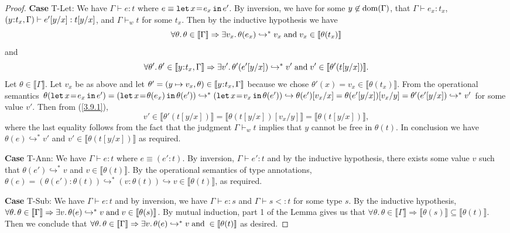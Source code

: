 \documentclass[11pt]{article}
\newcommand{\bind}{\hspace{0.05em}{:}\hspace{0.05em}} %
\newcommand{\col}{\mathbin{:}}       %
\newcommand{\lb}{\llbracket}         %
\newcommand{\rb}{\rrbracket}         %
\newcommand{\step}{\hookrightarrow}
\newcommand{\many}{\hookrightarrow^*}
\newcommand{\foralltheta}{\forall\theta.\,\theta\in\lb\Gamma\rb}
\newcommand{\letin}[3]{{\tt let}\,#1\hspace{0.1em}{=}\hspace{0.1em}#2\,{\tt in}\,#3}
\newcommand{\dom}[1]{{\rm dom}(#1)}
\begin{document}
\begin{proof}
{\bf Case} {\sc T-Let}: We have $\Gamma \vdash e : t$ where
$e \equiv \letin{x}{e_x}{e'}$.
By inversion, we have for some $y\not\in\dom{\Gamma}$, that
$\Gamma \vdash e_x : t_x$,\; $(y\bind t_x,\Gamma) \vdash e'[y/x] : t[y/x]$, and $\Gamma \vdash_w t$
for some $t_x$. Then by the inductive hypothesis we have
\[
\foralltheta \Rightarrow \exists v_x.\, \theta(e_x) \many v_x \;{\rm and}\; v_x \in \lb\theta(t_x)\rb
\] and 
\begin{equation}\label{3.9.1}
\forall\theta'.\, \theta' \in \lb y\bind t_x, \Gamma\rb \Rightarrow \exists v'.\, \theta'(e'[y/x]) \many v' \;{\rm and}\; v' \in \lb\theta'(t[y/x])\rb.
\end{equation}
Let $\theta \in \lb\Gamma\rb$. Let $v_x$ be as above and let $\theta' = (y\mapsto v_x, \theta)\in \lb y\bind t_x,\Gamma\rb$ because we chose $\theta'(x) = v_x \in \lb\theta(t_x)\rb$. 
From the operational semantics $\theta(\letin{x}{e_x}{e'}) = (\letin{x}{\theta(e_x)}{\theta(e')}) \many (\letin{x}{v_x}{\theta(e')}) \step \theta(e')[v_x/x] = \theta(e'[y/x])[v_x/y] = \theta'(e'[y/x]) \many v'$ for some value $v'$.
 Then from (\ref{3.9.1}),
\[
v' \in \lb\theta'(t[y/x])\rb = \lb\theta(t[y/x])[v_x/y]\rb = \lb\theta(t[y/x])\rb,
\]
where the last equality follows from the fact that the judgment $\Gamma \vdash_w t$ implies that $y$ cannot be free in $\theta(t)$.
In conclusion we have $\theta(e) \many v'$ and $v' \in \lb\theta(t[y/x])\rb$ as required.

{\bf Case} {\sc T-Ann}: We have $\Gamma \vdash e : t$ where $e \equiv (e'\col t)$. By inversion, $\Gamma \vdash e' : t$ and by the inductive hypothesis, there exists some value $v$ such that $\theta(e') \many v$ and $v \in \lb\theta(t)\rb$. 
By the operational semantics of type annotations, $\theta(e) = (\theta(e')\col \theta(t)) \many (v\col \theta(t)) \step v \in \lb\theta(t)\rb$, as required. 

{\bf Case} {\sc T-Sub}: We have $\Gamma \vdash e : t $ and by inversion, we have $\Gamma \vdash e : s$ and $\Gamma \vdash s <: t$ for some type $s$. By the inductive hypothesis, 
$\foralltheta \Rightarrow \exists v.\, \theta(e) \many v \;{\rm and}\; v\in \lb\theta(s)\rb$. By mutual induction, part 1 of the Lemma gives us that $\foralltheta \Rightarrow \lb\theta(s)\rb \subseteq \lb\theta(t)\rb$.
Then we conclude that $\foralltheta \Rightarrow \exists v.\, \theta(e) \many v \;{\rm and}\; \in \lb\theta(t)\rb$ as desired.
\end{proof}
\end{document}
